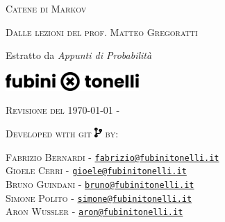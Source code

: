 \documentclass[a4paper]{article}
\begin{document}


\pagestyle{empty} %


\vspace{0.8cm}
\hspace{0.7cm}
{\textsc{\Huge Catene di Markov}}

\hspace{0.7cm}
{\scshape\large Dalle lezioni del prof. Matteo Gregoratti \par}

\hspace{0.7cm}
{\large Estratto da \textit{Appunti di Probabilità} \par}

\begin{center}
  {
  \includegraphics[width=0.38\textwidth]{img/Logo_s.png}}
\end{center}

\clearpage
{}


\textsc{Revisione del \today}
{- \texttt{}}
{}

\textsc{Developed with git \includegraphics[height=1em]{img/icons/code.pdf} by:}

\textsc{Fabrizio Bernardi} - \href{fabrizio@fubinitonelli.it}{\texttt{fabrizio@fubinitonelli.it}}\\
\textsc{Gioele Cerri} - \href{gioele@fubinitonelli.it}{\texttt{gioele@fubinitonelli.it}}\\
\textsc{Bruno Guindani} - \href{bruno@fubinitonelli.it}{\texttt{bruno@fubinitonelli.it}}\\
\textsc{Simone Polito} - \href{simone@fubinitonelli.it}{\texttt{simone@fubinitonelli.it}}\\
\textsc{Aron Wussler} - \href{aron@fubinitonelli.it}{\texttt{aron@fubinitonelli.it}}


\clearpage

\pagestyle{plain}


\hypersetup{linkcolor=black}

\setcounter{tocdepth}{2}
\tableofcontents
\hypersetup{linkcolor=blue}
\cleardoublepage

\pagestyle{inner}



\cleardoublepage

\pagestyle{plain}
{\small \printindex}

\clearpage
\end{document}
